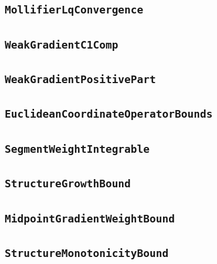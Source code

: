\documentclass[11pt]{amsart}
\theoremstyle{definition}
\begin{document}
\subsection{\texorpdfstring{\texttt{MollifierLqConvergence}}{MollifierLqConvergence}}\label{node:MollifierLqConvergence}


\subsection{\texorpdfstring{\texttt{WeakGradientC1Comp}}{WeakGradientC1Comp}}\label{node:WeakGradientC1Comp}


\subsection{\texorpdfstring{\texttt{WeakGradientPositivePart}}{WeakGradientPositivePart}}\label{node:WeakGradientPositivePart}


\subsection{\texorpdfstring{\texttt{EuclideanCoordinateOperatorBounds}}{EuclideanCoordinateOperatorBounds}}\label{node:EuclideanCoordinateOperatorBounds}


\subsection{\texorpdfstring{\texttt{SegmentWeightIntegrable}}{SegmentWeightIntegrable}}\label{node:SegmentWeightIntegrable}


\subsection{\texorpdfstring{\texttt{StructureGrowthBound}}{StructureGrowthBound}}\label{node:StructureGrowthBound}


\subsection{\texorpdfstring{\texttt{MidpointGradientWeightBound}}{MidpointGradientWeightBound}}\label{node:MidpointGradientWeightBound}


\subsection{\texorpdfstring{\texttt{StructureMonotonicityBound}}{StructureMonotonicityBound}}\label{node:StructureMonotonicityBound}

\end{document}
